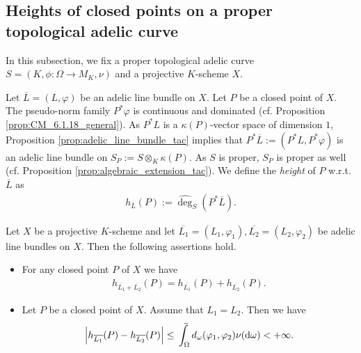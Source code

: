 \documentclass [11pt,reqno]{amsart}
\newcommand{\1}{\mathmybb{1}}
\def\diff{\mathrm{d}}
\def\upint{\mathchoice%
    {\mkern13mu\overline{\vphantom{\intop}\mkern7mu}\mkern-20mu}%
    {\mkern7mu\overline{\vphantom{\intop}\mkern7mu}\mkern-14mu}%
    {\mkern7mu\overline{\vphantom{\intop}\mkern7mu}\mkern-14mu}%
    {\mkern7mu\overline{\vphantom{\intop}\mkern7mu}\mkern-14mu}%
  \int}
\begin{document}
\subsection{Heights of closed points on a proper topological adelic curve}
\label{sub:height_of_closed_points_proper}

In this subsection, we fix a proper topological adelic curve $S=(K,\phi:\Omega\to M_K,\nu)$ and a projective $K$-scheme $X$. 

\begin{definition}
\label{def:height_closed_points_proper}
 Let $\overline{L}=(L,\varphi)$ be an adelic line bundle on $X$. Let $P$ be a closed point of $X$. The pseudo-norm family $P^{\ast}\varphi$ is continuous and dominated (cf. Proposition \ref{prop:CM_6.1.18_general}). As $P^{\ast}L$ is a $\kappa(P)$-vector space of dimension $1$, Proposition \ref{prop:adelic_line_bundle_tac} implies that $P^{\ast}\overline{L}:=(P^{\ast}L,P^{\ast}\varphi)$ is an adelic line bundle on $S_P := S\otimes_{K} \kappa(P)$. As $S$ is proper, $S_P$ is proper as well (cf. Proposition \ref{prop:algebraic_extension_tac}). We define the \emph{height} of $P$ w.r.t. $\overline{L}$ as 
\begin{align*}
h_{\overline{L}}(P) := \widehat{\deg}_{S}(P^{\ast}\overline{L}).
\end{align*}
\end{definition}

\begin{theorem}
\label{th:height_closed_points_proper}
Let $X$ be a projective $K$-scheme and let $\overline{L_1}=(L_1,\varphi_1),\overline{L_2}=(L_2,\varphi_2)$ be adelic line bundles on $X$. Then the following assertions hold.
\begin{itemize}
	\item[(1)] For any closed point $P$ of $X$ we have
	\begin{align*}
	h_{\overline{L_1}+\overline{L_2}}(P) = h_{\overline{L_1}}(P) + h_{\overline{L_2}}(P).
	\end{align*}
	\item[(2)] Let $P$ be a closed point of $X$. Assume that $L_1=L_2$. Then we have 
	\begin{align*}
	\left|h_{\overline{L_1}}(P)-h_{\overline{L_2}}(P)\right| \leq \upint_{\Omega}d_{\omega}(\varphi_1,\varphi_2)\nu(\diff\omega) < +\infty.
	\end{align*}
\end{itemize}
\end{theorem}
\end{document}
